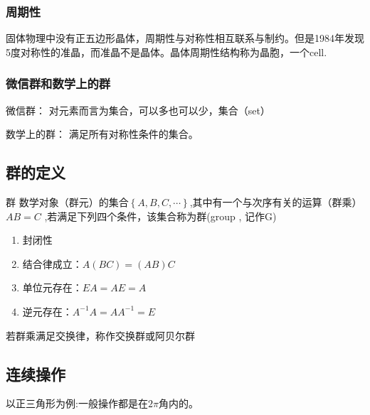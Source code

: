\documentclass[math=mtpro2,lang=cn,color=green,device=pad]{elegantbook}
\begin{document}
\subsubsection{周期性}

固体物理中没有正五边形晶体，周期性与对称性相互联系与制约。但是1984年发现5度对称性的准晶，而准晶不是晶体。晶体周期性结构称为晶胞，一个cell.

\subsubsection{微信群和数学上的群}

微信群： 对元素而言为集合，可以多也可以少，集合（set） 

数学上的群： 满足所有对称性条件的集合。

\subsection{群的定义}

\begin{definition}{群}
   数学对象（群元）的集合$\left\{ A,B,C,\cdots \right\}$,其中有一个与次序有关的运算（群乘）$AB=C$ ,若满足下列四个条件，该集合称为群(group , 记作G)
   \begin{enumerate}
      \item 封闭性
      \item 结合律成立：$A(BC)=(AB)C$
      \item 单位元存在：$EA=AE=A$
      \item 逆元存在：$A^{-1}A=AA^{-1}=E$
   \end{enumerate}
   \label{def:group1}
\end{definition}

\begin{note}
   若群乘满足交换律，称作交换群或阿贝尔群
\end{note}

\subsection{连续操作}

以正三角形为例:一般操作都是在$2\pi$角内的。
\end{document}
